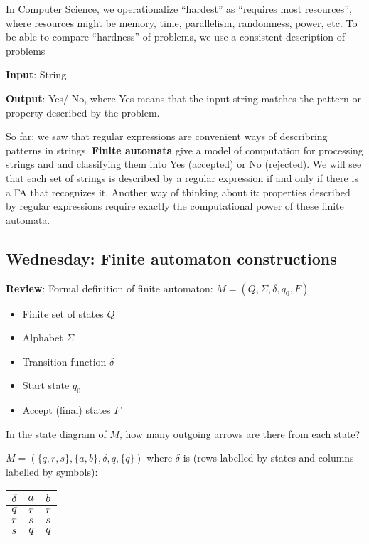 \documentclass[12pt, oneside]{article}
\begin{document}
\begin{flushright}
\end{flushright} 

In Computer Science, we operationalize ``hardest'' as ``requires most resources'', where
resources might be memory, time, parallelism, randomness, power, etc.
To be able to compare ``hardness'' of problems, we use a consistent description of problems

{\bf Input}: String

{\bf Output}: Yes/ No, where Yes means that the input string matches the pattern or property described by the problem.

So far: we saw that regular expressions are convenient ways of describring patterns in strings.
{\bf Finite automata} give a model of computation for processing strings and and classifying them into Yes (accepted)
or No (rejected). We will see that each set of strings is described by a regular expression if and only 
if there is a FA that recognizes it.  Another way of thinking about it: properties described by regular
expressions require exactly the computational power of these finite automata.


\subsection*{Wednesday: Finite automaton constructions}




{\bf Review}: Formal definition of finite automaton: $M = (Q, \Sigma, \delta, q_0, F)$ 

\begin{center}
\begin{multicols}{2}
\begin{itemize}
\setlength{\itemsep}{2pt}
\item Finite set of states $Q$
\item Alphabet $\Sigma$
\item Transition function $\delta$
\item Start state $q_0$
\item Accept (final) states $F$
\end{itemize}
\end{multicols}
\end{center}
In the state diagram of $M$, how many outgoing arrows are there from each state?

$M = ( \{ q, r, s\}, \{a,b\}, \delta, q, \{q\} )$ 
where $\delta$ is  (rows labelled by states
and columns labelled by symbols):
\begin{center}
\begin{tabular}{c|cc}
$\delta$ & $a$ & $b$ \\
\hline
$q$ & $r$ & $r$ \\
$r$ & $s$ & $s$ \\
$s$ & $q$ & $q$ \\
\end{tabular}
\end{center}
\end{document}
